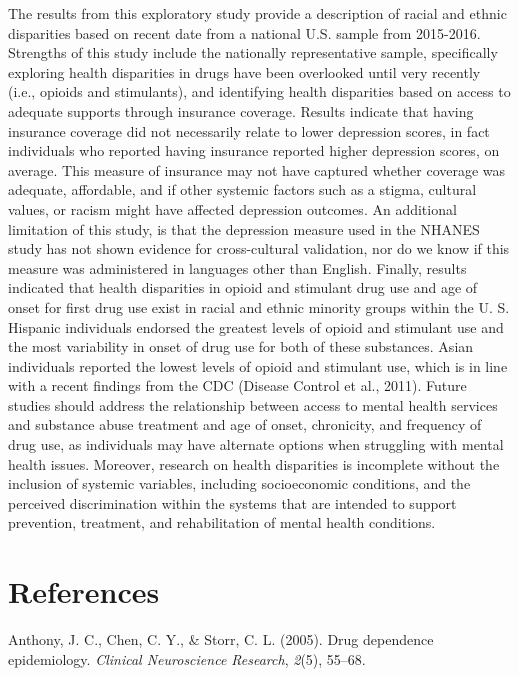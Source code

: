 \documentclass[man]{apa6}
\begin{document}
The results from this exploratory study provide a description of racial
and ethnic disparities based on recent date from a national U.S. sample
from 2015-2016. Strengths of this study include the nationally
representative sample, specifically exploring health disparities in
drugs have been overlooked until very recently (i.e., opioids and
stimulants), and identifying health disparities based on access to
adequate supports through insurance coverage. Results indicate that
having insurance coverage did not necessarily relate to lower depression
scores, in fact individuals who reported having insurance reported
higher depression scores, on average. This measure of insurance may not
have captured whether coverage was adequate, affordable, and if other
systemic factors such as a stigma, cultural values, or racism might have
affected depression outcomes. An additional limitation of this study, is
that the depression measure used in the NHANES study has not shown
evidence for cross-cultural validation, nor do we know if this measure
was administered in languages other than English. Finally, results
indicated that health disparities in opioid and stimulant drug use and
age of onset for first drug use exist in racial and ethnic minority
groups within the U. S. Hispanic individuals endorsed the greatest
levels of opioid and stimulant use and the most variability in onset of
drug use for both of these substances. Asian individuals reported the
lowest levels of opioid and stimulant use, which is in line with a
recent findings from the CDC (Disease Control et al., 2011). Future
studies should address the relationship between access to mental health
services and substance abuse treatment and age of onset, chronicity, and
frequency of drug use, as individuals may have alternate options when
struggling with mental health issues. Moreover, research on health
disparities is incomplete without the inclusion of systemic variables,
including socioeconomic conditions, and the perceived discrimination
within the systems that are intended to support prevention, treatment,
and rehabilitation of mental health conditions.

\newpage

\section{References}\label{references}

\begingroup
\setlength{\parindent}{-0.5in} \setlength{\leftskip}{0.5in}

\hypertarget{refs}{}
\hypertarget{ref-anthony2005drug}{}
Anthony, J. C., Chen, C. Y., \& Storr, C. L. (2005). Drug dependence
epidemiology. \emph{Clinical Neuroscience Research}, \emph{2}(5),
55--68.
\end{document}
